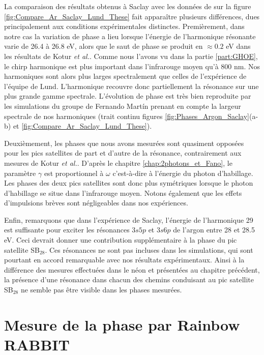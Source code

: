 La comparaison des résultats obtenus à Saclay avec les données de  sur la figure \ref{fig:Compare_Ar_Saclay_Lund_These} fait apparaître plusieurs différences, dues principalement aux conditions expérimentales distinctes. Premièrement, dans notre cas la variation de phase a lieu lorsque l'énergie de l'harmonique résonante varie de 26.4 à 26.8 eV, alors que le saut de phase se produit en $\approx 0.2$ eV dans les résultats de Kotur \textit{et al.}. Comme nous l'avons vu dans la partie \ref{part:GHOE}, le chirp harmonique est plus important dans l'infrarouge moyen qu'à 800 nm. Nos harmoniques sont alors plus larges spectralement que celles de l'expérience de l'équipe de Lund. L'harmonique recouvre donc partiellement la résonance sur une plus grande gamme spectrale. L'évolution de phase est très bien reproduite par les simulations du groupe de Fernando Mart\'{i}n prenant en compte la largeur spectrale de nos harmoniques (trait continu figures 
\ref{fig:Phases_Argon_Saclay}(a-b) et \ref{fig:Compare_Ar_Saclay_Lund_These}).

Deuxièmement, les phases que nous avons mesurées sont quasiment opposées pour les pics satellites de part et d'autre de la résonance, contrairement aux mesures de Kotur \textit{et al.}. D'après le chapitre \ref{chap:2photons_et_Fano}, le paramètre $\gamma$ est proportionnel à $\omega$ c'est-à-dire à l'énergie du photon d'habillage. Les phases des deux pics satellites sont donc plus symétriques lorsque le photon d'habillage se situe dans l'infrarouge moyen. Notons également que les effets d'impulsions brèves sont négligeables dans nos expériences. 

Enfin, remarquons que dans l'expérience de Saclay, l'énergie de l'harmonique 29 est suffisante pour exciter les résonances $3s5p$ et $3s6p$ de l'argon entre 28 et 28.5 eV. Ceci devrait donner une contribution supplémentaire à la phase du pic satellite SB$_{28}$. Ces résonances ne sont pas incluses dans les simulations, qui sont pourtant en accord remarquable avec nos résultats expérimentaux. Ainsi à la différence des mesures effectuées dans le néon et présentées au chapitre précédent, la présence d'une résonance dans chacun des chemins conduisant au pic satellite SB$_{28}$ ne semble pas être visible dans les phases mesurées.

\section{Mesure de la phase par Rainbow RABBIT}
